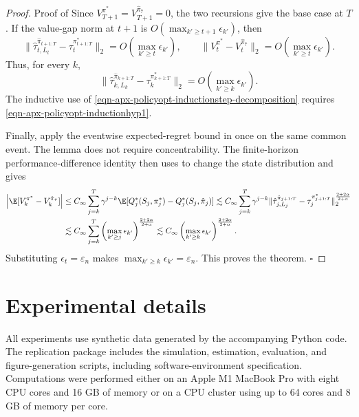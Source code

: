 \documentclass[opre,nonblindrev]{informs4}
\newcommand{\norm}[1]{\lVert#1\rVert}
\newcommand{\blipadv}{\tau}
\renewcommand{\qed}{\unskip\nobreak\hfill\ensuremath{\square}}
\begin{document}
\begin{proof}{Proof of }
Since $V_{T+1}^{\pi^*}=V_{T+1}^{\hat\pi_{\hat\blipadv}}=0$, the two
recursions give the base case at $T$. If the value-gap norm at $t+1$ is
$O(\max_{k'\geq t+1}\epsilon_{k'})$, then
\[
\norm{\hat\blipadv_{t,L_t}^{\hat\pi_{t+1:T}}
-\blipadv_t^{\pi^*_{t+1:T}}}_2
=O\!\left(\max_{k'\geq t}\epsilon_{k'}\right),
\qquad
\norm{V_t^{\pi^*}-V_t^{\hat\pi_{\hat\blipadv}}}_2
=O\!\left(\max_{k'\geq t}\epsilon_{k'}\right).
\]
Thus, for every $k$,
\begin{equation}
\norm{
\hat\blipadv_{k,L_k}^{\hat\pi_{k+1:T}}
-\blipadv_k^{\pi^*_{k+1:T}}
}_2
=O\!\left(\max_{k'\geq k}\epsilon_{k'}\right).
\label{eqn-apx-policyopt-inductionhyp1}
\end{equation}
The inductive use of
\cref{eqn-apx-policyopt-inductionstep-decomposition} requires
\cref{eqn-apx-policyopt-inductionhyp1}.

Finally, apply the eventwise expected-regret bound in
 once on the same common event. The lemma does
not require concentrability. The finite-horizon performance-difference
identity then uses  to change the state distribution
and gives
\begin{align}
\abs{\E[V_k^{\pi^*}-V_k^{\hat\pi_{\hat\blipadv}}]}
&\le
C_\infty
\sum_{j=k}^T\gamma^{j-k}
\E[
Q_j^*(S_j,\pi_j^*)-Q_j^*(S_j,\hat\pi_j)
]
\lesssim
C_\infty
\sum_{j=k}^T\gamma^{j-k}
\norm{
\hat\blipadv_{j,L_j}^{\hat\pi_{j+1:T}}
-\blipadv_j^{\pi^*_{j+1:T}}
}_2^{\frac{2+2\alpha}{2+\alpha}}
\notag\\
&\lesssim
C_\infty
\sum_{j=k}^T
\left(\max_{k'\geq j}\epsilon_{k'}\right)^
{\frac{2+2\alpha}{2+\alpha}}
\lesssim
C_\infty
\left(\max_{k'\geq k}\epsilon_{k'}\right)^
{\frac{2+2\alpha}{2+\alpha}}.
\label{eqn-apx-policyopt-value-rate}
\end{align}
Substituting $\epsilon_t=\varepsilon_n$ makes
$\max_{k'\geq k}\epsilon_{k'}=\varepsilon_n$. This proves the theorem. \qed
\end{proof}


\section{Experimental details}\label{sec-experimental-details}

All experiments use synthetic data generated by  the accompanying Python code. The replication package includes the simulation, estimation, evaluation, and figure-generation scripts, including software-environment specification. Computations were performed either on an Apple M1 MacBook Pro with eight CPU cores and 16 GB of memory or on a CPU cluster using up to 64 cores and 8 GB of memory per core. 
\end{document}
